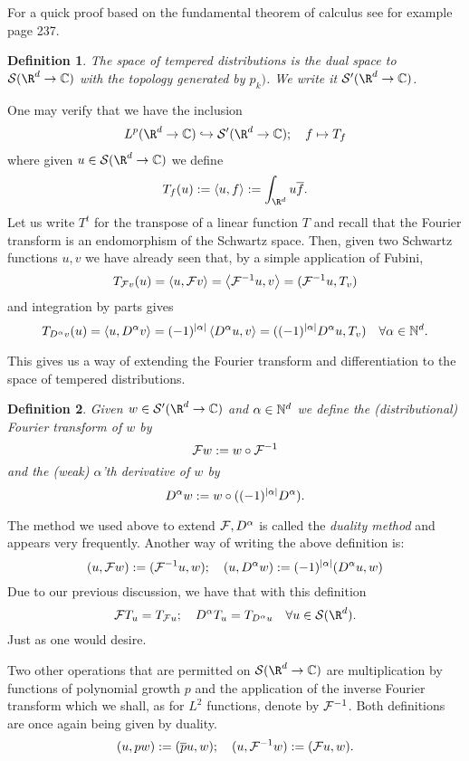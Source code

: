\documentclass[12pt]{article}
\newtheorem{definition}{Definition}
\newcommand{\br}[1]{\left\langle#1\right\rangle}
\begin{document}
For a quick proof based on the
fundamental theorem of calculus see for example \cite{Foll} page 237.
\begin{definition}
	The space of \emph{tempered distributions} is the dual space to $\Ss(\R^d\to\C)$ with the topology generated by $p_k)$. We write it $\Ss'(\R^d\to\C)$.
\end{definition}
One may verify that we have the inclusion
\begin{align}\label{lpisdistr}
	L^p(\R^d\to\C)\hookrightarrow\Ss'(\R^d\to\C);\quad f\mapsto T_f
\end{align}
where given $u\in \Ss(\R^d\to\C)$ we define \[T_f(u):=\br{u,f}:=\int_{\R^d} u\overline{f}.\]
Let us write $T^t$  for the transpose of a linear function $T$ and recall that the Fourier transform is an endomorphism of the Schwartz space. Then, given two Schwartz functions $u,v$ we have already seen that, by a simple application of Fubini,
\[T_{\Ff v}(u)=\br{u,\Ff v}=\br{\Ff^{-1} u,v}=(\Ff^{-1}u,T_v)\]
and integration by parts gives
\[T_{D^\alpha v}(u)=\br{u,D^\alpha v}=(-1)^\abs{\alpha}\br{D^\alpha u,v}=((-1)^\abs{\alpha}D^\alpha u,T_v)\quad\forall{\alpha}\in {\N^d}.\]

\bigbreak
This gives us a way of extending the Fourier transform and differentiation to the space of tempered distributions.
\begin{definition}
	Given $w\in\mathcal{S}'(\R^d\to\C)$ and $\alpha\in\mathbb{N}^d$ we define the \emph{(distributional) Fourier transform} of $w$ by
	\[\mathcal{F} w:= w\circ \mathcal{F}^{-1}\]
	and the \emph{(weak) $\alpha$'th} derivative of $w$ by
	\[D^\alpha w:= w\circ((-1)^\abs{\alpha}D^\alpha).\]

\end{definition}
The method we used above to extend $\mathcal{F}, D^\alpha$ is called the \emph{duality method} and appears very frequently. Another way of writing the above definition is:
\begin{equation*}
	(u, \mathcal{F} w):=(\mathcal{F}^{-1} u, w);\quad(u,D^\alpha w):=(-1)^\abs{\alpha}(D^\alpha u,w)
\end{equation*}
Due to our previous discussion, we have that with this definition
\begin{equation}\label{ftlpdistr}
	\Ff T_u=T_{\Ff u};\quad D^\alpha T_{u}=T_{D^\alpha u}\quad\forall u\in \Ss(\R^d).
\end{equation}
Just as one would desire.\bigbreak

Two other operations that are permitted on $\Ss(\R^d\to\C)$ are multiplication by functions of polynomial growth $p$ and the application of the inverse Fourier transform which we shall, as for $L^2$ functions, denote by $\mathcal{F}^{-1}$. Both definitions are once again being given by duality.
\begin{equation*}
	(u,pw):=(\overline{p}u,w);\quad (u,\mathcal{F}^{-1}w):=(\mathcal{F} u,w) .
\end{equation*}
\end{document}
